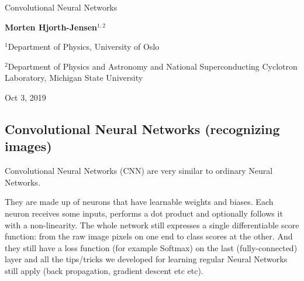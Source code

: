 \documentclass[%
oneside,                 %
final,                   %
10pt]{article}
\begin{document}

\newcommand{\exercisesection}[1]{\subsection*{#1}}






\thispagestyle{empty}

\begin{center}
{\LARGE\bf
\begin{spacing}{1.25}
Convolutional Neural Networks
\end{spacing}
}
\end{center}


\begin{center}
{\bf Morten Hjorth-Jensen${}^{1, 2}$} \\ [0mm]
\end{center}

\begin{center}
\centerline{{\small ${}^1$Department of Physics, University of Oslo}}
\centerline{{\small ${}^2$Department of Physics and Astronomy and National Superconducting Cyclotron Laboratory, Michigan State University}}
\end{center}
    

\begin{center}
Oct 3, 2019
\end{center}

\vspace{1cm}


\subsection*{Convolutional Neural Networks (recognizing images)}

Convolutional Neural Networks (CNN) are very similar to ordinary Neural Networks.

They are made up of neurons that have learnable weights and
biases. Each neuron receives some inputs, performs a dot product and
optionally follows it with a non-linearity. The whole network still
expresses a single differentiable score function: from the raw image
pixels on one end to class scores at the other. And they still have a
loss function (for example Softmax) on the last (fully-connected) layer
and all the tips/tricks we developed for learning regular Neural
Networks still apply (back propagation, gradient descent etc etc).
\end{document}
